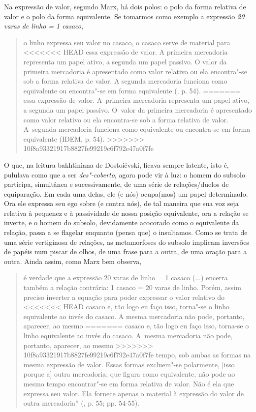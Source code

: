 {Na expressão de valor, segundo Marx, há dois polos: o polo da forma
relativa de valor e o polo da forma equivalente. Se tomarmos como
exemplo a expressão \emph{20 varas de linho = 1 casaco},

\begin{quote}
o linho expressa seu valor no casaco, o casaco serve de material para
<<<<<<< HEAD
essa expressão de valor. A primeira mercadoria representa um papel
ativo, a segunda um papel passivo. O valor da primeira mercadoria é
apresentado como valor relativo ou ela encontra"-se sob a forma relativa
de valor. A segunda mercadoria funciona como equivalente ou encontra"-se
em forma equivalente (, p. 54).
=======
essa expressão de valor. A~primeira mercadoria representa um papel
ativo, a segunda um papel passivo. O~valor da primeira mercadoria é
apresentado como valor relativo ou ela encontra-se sob a forma relativa
de valor. A~segunda mercadoria funciona como equivalente ou encontra-se
em forma equivalente (IDEM, p. 54).
>>>>>>> 10f8a93321917b8827fe99219c6f792e47a0f7fe
\end{quote}

O que, na leitura bakhtiniana de Dostoiévski, ficava sempre latente,
isto é, pululava como que a ser \emph{des"-coberto}, agora pode vir à
luz: o homem do subsolo participa, simultânea e sucessivamente, de uma
série de relações/duelos de equiparação. Em cada uma delas, ele (e nós)
ocupa(mos) um papel determinado. Ora ele expressa seu ego sobre (e
contra nós), de tal maneira que sua voz seja relativa à pequenez e à
passividade de nossa posição equivalente, ora a relação se inverte, e o
homem do subsolo, devidamente acocorado como o equivalente da relação,
passa a se flagelar enquanto (pensa que) o insultamos. Como se trata de
uma série vertiginosa de relações, as metamorfoses do subsolo implicam
inversões de papéis num piscar de olhos, de uma frase para a outra, de
uma oração para a outra. Ainda assim, como Marx bem observa,

\begin{quote}
é verdade que a expressão 20 varas de linho = 1 casaco (...) encerra
também a relação contrária: 1 casaco = 20 varas de linho. Porém, assim
preciso inverter a equação para poder expressar o valor relativo do
<<<<<<< HEAD
casaco e, tão logo eu faço isso, torna"-se o linho equivalente ao invés
do casaco. A mesma mercadoria não pode, portanto, aparecer, ao mesmo
=======
casaco e, tão logo eu faço isso, torna-se o linho equivalente ao invés
do casaco. A~mesma mercadoria não pode, portanto, aparecer, ao mesmo
>>>>>>> 10f8a93321917b8827fe99219c6f792e47a0f7fe
tempo, sob ambas as formas na mesma expressão de valor. Essas formas
excluem"-se polarmente, {[}isso porque a{]} outra mercadoria, que figura
como equivalente, não pode ao mesmo tempo encontrar"-se em forma relativa
de valor. Não é ela que expressa seu valor. Ela fornece apenas o
material à expressão do valor de outra mercadoria'' (, p. 55; pp.
54-55).
\end{quote}

}
